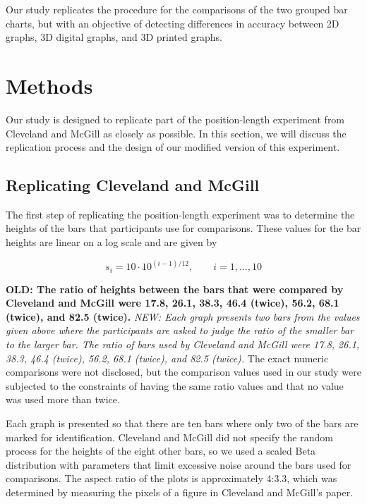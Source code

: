 \documentclass[letterpaper,inpress]{jdsart}
\begin{document}
Our study replicates the procedure for the comparisons of the two grouped bar charts, but with an objective of detecting differences in accuracy between 2D graphs, 3D digital graphs, and 3D printed graphs.

\hypertarget{methods}{%
\section{Methods}\label{methods}}

Our study is designed to replicate part of the position-length experiment from Cleveland and McGill as closely as possible.
In this section, we will discuss the replication process and the design of our modified version of this experiment.

\hypertarget{replicating-cleveland-and-mcgill}{%
\subsection{Replicating Cleveland and McGill}\label{replicating-cleveland-and-mcgill}}

The first step of replicating the position-length experiment was to determine the heights of the bars that participants use for comparisons.
These values for the bar heights are linear on a log scale and are given by

\[s_i=10\cdot 10^{(i-1)/12}, \qquad i=1,...,10\]

\textbf{OLD: The ratio of heights between the bars that were compared by Cleveland and McGill were 17.8, 26.1, 38.3, 46.4 (twice), 56.2, 68.1 (twice), and 82.5 (twice).}
\emph{NEW: Each graph presents two bars from the values given above where the participants are asked to judge the ratio of the smaller bar to the larger bar. The ratio of bars used by Cleveland and McGill were 17.8, 26.1, 38.3, 46.4 (twice), 56.2, 68.1 (twice), and 82.5 (twice).}
The exact numeric comparisons were not disclosed, but the comparison values used in our study were subjected to the constraints of having the same ratio values and that no value was used more than twice.

Each graph is presented so that there are ten bars where only two of the bars are marked for identification.
Cleveland and McGill did not specify the random process for the heights of the eight other bars, so we used a scaled Beta distribution with parameters that limit excessive noise around the bars used for comparisons.
The aspect ratio of the plots is approximately 4:3.3, which was determined by measuring the pixels of a figure in Cleveland and McGill's paper.
\end{document}
